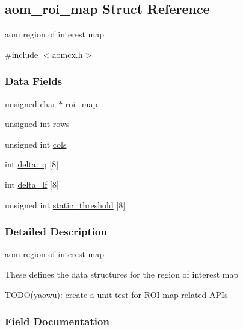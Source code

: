 \hypertarget{structaom__roi__map}{}\subsection{aom\+\_\+roi\+\_\+map Struct Reference}
\label{structaom__roi__map}


aom region of interest map  




{\ttfamily \#include $<$aomcx.\+h$>$}

\subsubsection*{Data Fields}
\begin{DoxyCompactItemize}
\item 
unsigned char $\ast$ \hyperlink{structaom__roi__map_a7d12a1d1074e33fd32077d568e4304d6}{roi\+\_\+map}
\item 
unsigned int \hyperlink{structaom__roi__map_a70a76ce19292cbdf943a5658b9601fdd}{rows}
\item 
unsigned int \hyperlink{structaom__roi__map_a33d4739da69f1885bf7572b99cc9b367}{cols}
\item 
int \hyperlink{structaom__roi__map_a85c39484ec01f907a1d50aa969d38ee2}{delta\+\_\+q} \mbox{[}8\mbox{]}
\item 
int \hyperlink{structaom__roi__map_a3a37c73fcdcfac9f6f7fec338e746982}{delta\+\_\+lf} \mbox{[}8\mbox{]}
\item 
unsigned int \hyperlink{structaom__roi__map_a68f795675cf54a123c89e2f9dda9063f}{static\+\_\+threshold} \mbox{[}8\mbox{]}
\end{DoxyCompactItemize}


\subsubsection{Detailed Description}
aom region of interest map 

These defines the data structures for the region of interest map

T\+O\+D\+O(yaowu)\+: create a unit test for R\+OI map related A\+P\+Is 

\subsubsection{Field Documentation}
